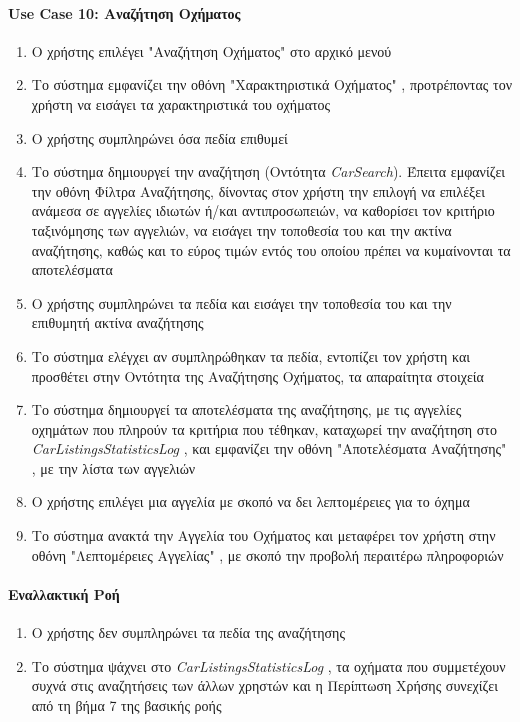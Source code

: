\documentclass{../ol-softwaremanual}
\begin{document}
	\paragraph{\en Use Case 10: \gr Αναζήτηση Οχήματος}  
	\begin{enumerate}
		\item Ο χρήστης επιλέγει \en"\gr Αναζήτηση Οχήματος\en" \gr στο αρχικό μενού
		\item Το σύστημα εμφανίζει την οθόνη \en"\gr Χαρακτηριστικά Οχήματος\en" \gr, προτρέποντας τον χρήστη να εισάγει τα χαρακτηριστικά του οχήματος 
		\item Ο χρήστης συμπληρώνει όσα πεδία επιθυμεί
		\item Το σύστημα δημιουργεί την αναζήτηση (Οντότητα \en \textit{CarSearch}\gr). Έπειτα εμφανίζει την οθόνη Φίλτρα Αναζήτησης, δίνοντας στον χρήστη την επιλογή να επιλέξει ανάμεσα σε αγγελίες ιδιωτών ή/και αντιπροσωπειών, να καθορίσει τον κριτήριο ταξινόμησης των αγγελιών, να εισάγει την τοποθεσία του και την ακτίνα αναζήτησης, καθώς και το εύρος τιμών εντός του οποίου πρέπει να κυμαίνονται τα αποτελέσματα
		\item Ο χρήστης συμπληρώνει τα πεδία και εισάγει την τοποθεσία του και την επιθυμητή ακτίνα αναζήτησης
		\item Το σύστημα ελέγχει αν συμπληρώθηκαν τα πεδία, εντοπίζει τον χρήστη και προσθέτει στην Οντότητα της Αναζήτησης Οχήματος, τα απαραίτητα στοιχεία
		\item Το σύστημα δημιουργεί τα αποτελέσματα της αναζήτησης, με τις αγγελίες οχημάτων που πληρούν τα κριτήρια που τέθηκαν, καταχωρεί την αναζήτηση στο \en \textit{CarListingsStatisticsLog} \gr, και εμφανίζει την οθόνη \en"\gr Αποτελέσματα Αναζήτησης\en" \gr, με την λίστα των αγγελιών 
		\item Ο χρήστης επιλέγει μια αγγελία με σκοπό να δει λεπτομέρειες για το όχημα
		\item Το σύστημα ανακτά την Αγγελία του Οχήματος και μεταφέρει τον χρήστη στην οθόνη \en"\gr Λεπτομέρειες Αγγελίας\en" \gr, με σκοπό την προβολή περαιτέρω πληροφοριών	
	\end{enumerate}
	
	
	\paragraph{Εναλλακτική Ροή}
	\begin{enumerate}
		\item Ο χρήστης δεν συμπληρώνει τα πεδία της αναζήτησης
		\item Το σύστημα ψάχνει στο \en \textit{CarListingsStatisticsLog} \gr, τα οχήματα που συμμετέχουν συχνά στις αναζητήσεις των άλλων χρηστών και η Περίπτωση Χρήσης συνεχίζει από τη βήμα 7 της βασικής ροής
	\end{enumerate}
	
\end{document}
